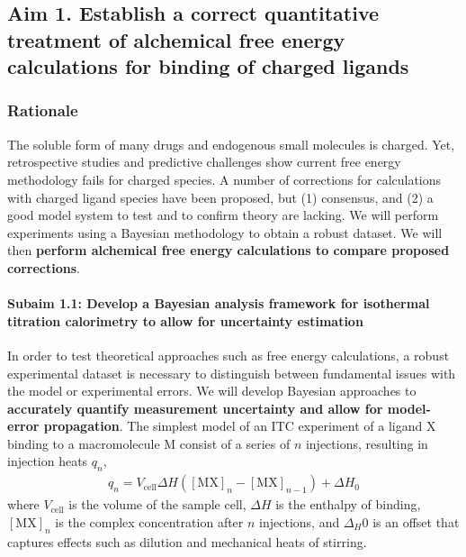 \documentclass[10pt,final]{article}
\newcommand{\subsubsubsection}[1]{\paragraph*{#1}}
\begin{document}


\subsection*{Aim 1. Establish a correct quantitative treatment of alchemical free energy calculations for binding of charged ligands}
\subsubsection*{Rationale}
The soluble form of many drugs and endogenous small molecules is charged. Yet, retrospective studies and predictive challenges show current free energy methodology fails for charged species\cite{Rocklin2013b,Muddana2014a}.
A number of corrections for calculations with charged ligand species have been proposed, but (1) consensus, and (2) a good model system to test and to confirm theory are lacking\cite{Reif2013a,Rocklin2013a}. We will perform experiments using a Bayesian methodology to obtain a robust dataset. We will then \textbf{ perform alchemical free energy calculations to compare proposed corrections}.
\subsubsubsection{Subaim 1.1: Develop a Bayesian analysis framework for isothermal titration calorimetry to allow for uncertainty estimation}
In order to test theoretical approaches such as free energy calculations, a robust experimental dataset is necessary to distinguish between fundamental issues with the model or experimental errors. 
We will develop Bayesian approaches to \textbf{accurately quantify measurement uncertainty and allow for model-error propagation}. 
The simplest model of an ITC experiment of a ligand $\mathrm{X}$ binding to a macromolecule $\mathrm{M}$ consist of a series of $n$ injections, resulting in injection heats $q_n$,
\begin{align}
	q_n = V_\mathrm{cell} \Delta H \left( [\mathrm{MX}]_n - [\mathrm{MX}]_{n-1} \right) + \Delta H_0 \label{equation:liberated-heat}
\end{align}
where $V_\mathrm{cell}$ is the volume of the sample cell, $\Delta H$ is the enthalpy of binding, $[\mathrm{MX}]_n$ is the complex concentration after $n$ injections, and $\Delta_H0$ is an offset that captures effects such as dilution and mechanical heats of stirring.
\end{document}
